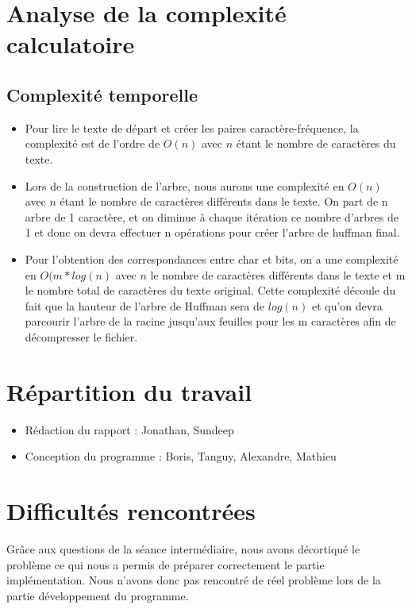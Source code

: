 \documentclass[11pt]{article}
\begin{document}
\section{Analyse de la complexité calculatoire}
\subsection{Complexité temporelle}
\begin{itemize}
\item Pour lire le texte de départ et créer les paires caractère-fréquence, la complexité est de l'ordre de $O(n)$ avec $n$ étant le nombre de caractères du texte.
\item Lors de la construction de l'arbre, nous aurons une complexité en $O(n)$ avec $n$ étant le nombre de caractères différents dans le texte. On part de n arbre de 1 caractère, et on diminue à chaque itération ce nombre d'arbres de 1 et donc on devra effectuer n opérations pour créer l'arbre de huffman final.
\item Pour l'obtention des correspondances entre char et bits, on a une complexité en $O(m*log(n)$ avec $n$ le nombre de caractères différents dans le texte et m le nombre total de caractères du texte original. Cette complexité découle du fait que la hauteur de l'arbre de Huffman sera de $log(n)$ et qu'on devra parcourir l'arbre de la racine jusqu'aux feuilles pour les m caractères afin de décompresser le fichier.
\end{itemize}

\section{Répartition du travail}

\begin{itemize}
\item Rédaction du rapport : Jonathan, Sundeep
\item Conception du programme : Boris, Tanguy, Alexandre, Mathieu
\end{itemize}

\section{Difficultés rencontrées}
Grâce aux questions de la séance intermédiaire, nous avons décortiqué le problème ce qui nous a permis de préparer correctement le partie implémentation. Nous n'avons donc pas rencontré de réel problème lors de la partie développement du programme.
\end{document}
